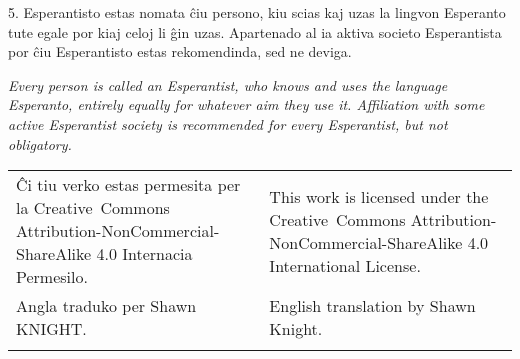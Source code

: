 \documentclass[11pt]{article}
\newcommand{\righty}[1]{\begin{adjustwidth}{100pt}{0pt}\it\traduko #1\end{adjustwidth}}
\newcommand{\sectionline}{
\begin{center}
\pgfornament[width=0.5\textwidth]{89}
\end{center}}
\begin{document}
5. Esperantisto estas nomata ĉiu persono, kiu scias kaj uzas la lingvon Esperanto tute egale por kiaj celoj li ĝin uzas. Apartenado al ia aktiva societo Esperantista por ĉiu Esperantisto estas rekomendinda, sed ne deviga.

\righty{Every person is called an Esperantist, who knows and uses the language Esperanto, entirely equally for whatever aim they use it.  Affiliation with some active Esperantist society is recommended for every Esperantist, but not obligatory.}

\sectionline

\begin{tabu} to
Ĉi tiu verko estas permesita per la Creative~Commons Attribution-NonCommercial-ShareAlike 4.0 Internacia Permesilo. & This work is licensed under the Creative~Commons Attribution-NonCommercial-ShareAlike 4.0 International License. \\[1ex]
Angla traduko per Shawn KNIGHT. & English translation by Shawn Knight.\\
\end{tabu}
\end{document}
